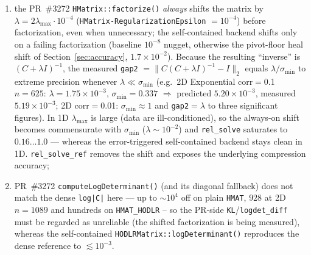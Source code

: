 \documentclass[11pt,a4paper]{article}
\begin{document}
\begin{enumerate}
\item the PR~\#3272 \texttt{HMatrix::factorize()} \emph{always} shifts the
  matrix by $\lambda = 2\lambda_{\max}\cdot 10^{-4}$ (\texttt{HMatrix-RegularizationEpsilon}
  $=10^{-4}$) before factorization, even when unnecessary; the self-contained
  backend shifts only on a failing factorization (baseline $10^{-8}$ nugget,
  otherwise the pivot-floor heal shift of Section~\ref{sec:accuracy},
  $1.7\times10^{-2}$).  Because the resulting
  ``inverse'' is $(C+\lambda I)^{-1}$, the measured \texttt{gap2}
  $=\|C(C+\lambda I)^{-1}-I\|_2$ equals $\lambda/\sigma_{\min}$ to extreme
  precision whenever $\lambda \ll \sigma_{\min}$ (e.g.\ 2D Exponential
  corr$=$0.1 $n{=}625$: $\lambda{=}1.75\times10^{-3}$, $\sigma_{\min}{=}0.337$
  $\Rightarrow$ predicted $5.20\times10^{-3}$, measured $5.19\times10^{-3}$;
  2D corr$=$0.01: $\sigma_{\min}\approx 1$ and \texttt{gap2}$=\lambda$ to three
  significant figures).  In 1D $\lambda_{\max}$ is large (data are
  ill-conditioned), so the always-on shift becomes commensurate with
  $\sigma_{\min}$ ($\lambda\sim 10^{-2}$) and \texttt{rel\_solve} saturates to
  $0.16\dots 1.0$ --- whereas the error-triggered self-contained backend stays
  clean in 1D.  \texttt{rel\_solve\_ref} removes the shift and exposes the
  underlying compression accuracy;
\item PR~\#3272 \texttt{computeLogDeterminant()} (and its diagonal fallback)
  does not match the dense \texttt{log|C|} here --- up to $\sim 10^{4}$ off on
  plain \texttt{HMAT}, $928$ at 2D $n{=}1089$ and hundreds on \texttt{HMAT\_HODLR}
  -- so the PR-side \texttt{KL}/\texttt{logdet\_diff} must be regarded as
  unreliable (the shifted factorization is being measured), whereas the
  self-contained \texttt{HODLRMatrix::logDeterminant()} reproduces the dense
  reference to $\lesssim 10^{-3}$.
\end{enumerate}
\end{document}
